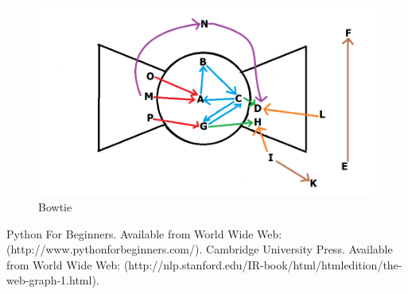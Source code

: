 \documentclass[a4paper, 11pt]{article}
\begin{document}
\begin{figure}[h]
\caption{Bowtie}
\centering
\includegraphics[scale=0.5]{Q2/bowtie.png}
\end{figure}

\begin{thebibliography}{9}
 Python For Beginners. Available from World Wide Web:(http://www.pythonforbeginners.com/).
 Cambridge University Press. Available from World Wide Web: (http://nlp.stanford.edu/IR-book/html/htmledition/the-web-graph-1.html).
\end{thebibliography}
\end{document}
